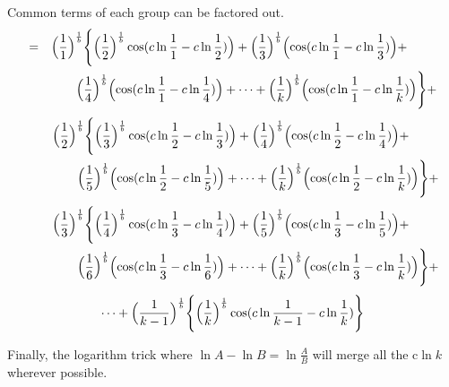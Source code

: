 \documentclass{amsart}
\begin{document}
	Common terms of each group can be factored out.
	\[
	\begin{aligned}
		= \quad & \Bigl( \frac{1}{1} \Bigr)^\frac1b \Biggl\{ \Bigl( \frac{1}{2} \Bigr)^\frac1b \cos(c \ln \frac{1}{1} - c \ln \frac{1}{2}) \Bigr) + \Bigl( \frac{1}{3} \Bigr)^\frac1b \Bigl( \cos(c \ln \frac{1}{1} - c \ln \frac{1}{3}) \Bigr) + \\
		& \qquad \Bigl( \frac{1}{4} \Bigr)^\frac1b \Bigl( \cos(c \ln \frac{1}{1} - c \ln \frac{1}{4}) \Bigr) + \dots  + \Bigl( \frac{1}{k} \Bigr)^\frac1b \Bigl( \cos(c \ln \frac{1}{1} - c \ln \frac{1}{k}) \Bigr) \Biggr\} + 
	\end{aligned}
	\]
	\[
	\begin{aligned}
		\quad\quad & \Bigl( \frac{1}{2}  \Bigr)^\frac1b \Biggl\{ \Bigl( \frac{1}{3} \Bigr)^\frac1b \cos(c \ln \frac{1}{2} - c \ln \frac{1}{3}) \Bigr) + \Bigl( \frac{1}{4} \Bigr)^\frac1b \Bigl( \cos(c \ln \frac{1}{2} - c \ln \frac{1}{4}) \Bigr) + \\
		& \qquad \Bigl( \frac{1}{5} \Bigr)^\frac1b \Bigl( \cos(c \ln \frac{1}{2} - c \ln \frac{1}{5}) \Bigr) + \dots  + \Bigl( \frac{1}{k} \Bigr)^\frac1b \Bigl( \cos(c \ln \frac{1}{2} - c \ln \frac{1}{k}) \Bigr) \Biggr\} + 
	\end{aligned}
	\]
	\[
	\begin{aligned}
		\quad\quad & \Bigl( \frac{1}{3} \Bigr)^\frac1b \Biggl\{ \Bigl( \frac{1}{4} \Bigr)^\frac1b \cos(c \ln \frac{1}{3} - c \ln \frac{1}{4}) \Bigr) + \Bigl( \frac{1}{5} \Bigr)^\frac1b \Bigl( \cos(c \ln \frac{1}{3} - c \ln \frac{1}{5}) \Bigr) + \\
		& \qquad \Bigl( \frac{1}{6} \Bigr)^\frac1b \Bigl( \cos(c \ln \frac{1}{3} - c \ln \frac{1}{6}) \Bigr) + \dots  + \Bigl( \frac{1}{k} \Bigr)^\frac1b \Bigl( \cos(c \ln \frac{1}{3} - c \ln \frac{1}{k}) \Bigr) \Biggr\} + 
	\end{aligned}
	\]
	\[ \dots + \Bigl( \frac{1}{k-1} \Bigr)^\frac1b \Biggl\{ \Bigl( \frac{1}{k} \Bigr)^\frac1b \cos(c \ln \frac{1}{k-1} - c \ln \frac{1}{k}) \Biggr\} \]
	
	
	Finally, the logarithm trick where $ \ln{A} - \ln{B} = \ln{\frac{A}{B}} $ will merge all the c$\ln k$ wherever possible.
	
\end{document}

